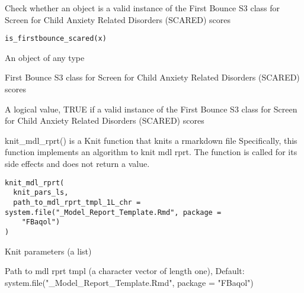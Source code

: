 \documentclass[a4paper]{book}
\begin{document}
%
\begin{Description}\relax
Check whether an object is a valid instance of the First Bounce S3 class for Screen for Child Anxiety Related Disorders (SCARED) scores
\end{Description}
%
\begin{Usage}
\begin{verbatim}
is_firstbounce_scared(x)
\end{verbatim}
\end{Usage}
%
\begin{Arguments}
\begin{ldescription}
\item[\code{x}] An object of any type
\end{ldescription}
\end{Arguments}
%
\begin{Details}\relax
First Bounce S3 class for Screen for Child Anxiety Related Disorders (SCARED) scores
\end{Details}
%
\begin{Value}
A logical value, TRUE if a valid instance of the First Bounce S3 class for Screen for Child Anxiety Related Disorders (SCARED) scores
\end{Value}
%
\begin{Description}\relax
knit\_mdl\_rprt() is a Knit function that knits a rmarkdown file Specifically, this function implements an algorithm to knit mdl rprt. The function is called for its side effects and does not return a value.
\end{Description}
%
\begin{Usage}
\begin{verbatim}
knit_mdl_rprt(
  knit_pars_ls,
  path_to_mdl_rprt_tmpl_1L_chr = system.file("_Model_Report_Template.Rmd", package =
    "FBaqol")
)
\end{verbatim}
\end{Usage}
%
\begin{Arguments}
\begin{ldescription}
\item[\code{knit\_pars\_ls}] Knit parameters (a list)

\item[\code{path\_to\_mdl\_rprt\_tmpl\_1L\_chr}] Path to mdl rprt tmpl (a character vector of length one), Default: system.file("\_Model\_Report\_Template.Rmd", package = "FBaqol")
\end{ldescription}
\end{Arguments}
\end{document}
